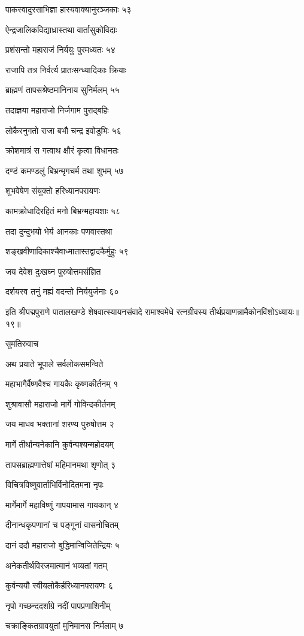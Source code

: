 पाकस्वादुरसाभिज्ञा हास्यवाक्यानुरञ्जकाः ५३

ऐन्द्रजालिकविद्याध्रास्तथा वार्तासुकोविदाः

प्रशंसन्तो महाराजं निर्ययुः पुरमध्यतः ५४

राजापि तत्र निर्वर्त्य प्रातःसन्ध्यादिकाः क्रियाः

ब्राह्मणं तापसश्रेष्ठमानिनाय सुनिर्मलम् ५५

तदाज्ञया महाराजो निर्जगाम पुराद्बहिः

लोकैरनुगतो राजा बभौ चन्द्र इवोडुभिः ५६

क्रोशमात्रं स गत्वाथ क्षौरं कृत्वा विधानतः

दण्डं कमण्डलुं बिभ्रन्मृगचर्म तथा शुभम् ५७

शुभवेषेण संयुक्तो हरिध्यानपरायणः

कामक्रोधादिरहितं मनो बिभ्रन्महायशाः ५८

तदा दुन्दुभयो भेर्य आनकाः पणवास्तथा

शङ्खवीणादिकाश्चैवाध्मातास्तद्वादकैर्मुहुः ५९

जय देवेश दुःखघ्न पुरुषोत्तमसंज्ञित

दर्शयस्व तनुं मह्यं वदन्तो निर्ययुर्जनाः ६०

इति श्रीपद्मपुराणे पातालखण्डे शेषवात्स्यायनसंवादे रामाश्वमेधे रत्नग्रीवस्य तीर्थप्रयाणन्नामैकोनविंशोऽध्यायः॥१९॥


सुमतिरुवाच

अथ प्रयाते भूपाले सर्वलोकसमन्विते

महाभागैर्वैष्णवैश्च गायकैः कृष्णकीर्तनम् १

शुश्रावासौ महाराजो मार्गे गोविन्दकीर्तनम्

जय माधव भक्तानां शरण्य पुरुषोत्तम २

मार्गे तीर्थान्यनेकानि कुर्वन्पश्यन्महोदयम्

तापसब्राह्मणात्तेषां महिमानमथा शृणोत् ३

विचित्रविष्णुवार्ताभिर्विनोदितमना नृपः

मार्गेमार्गे महाविष्णुं गापयामास गायकान् ४

दीनान्धकृपणानां च पङ्गूनां वासनोचितम्

दानं ददौ महाराजो बुद्धिमान्विजितेन्द्रियः ५

अनेकतीर्थविरजमात्मानं भव्यतां गतम्

कुर्वन्ययौ स्वीयलोकैर्हरिध्यानपरायणः ६

नृपो गच्छन्ददर्शाग्रे नदीं पापप्रणाशिनीम्

चक्राङ्कितग्रावयुतां मुनिमानस निर्मलाम् ७


